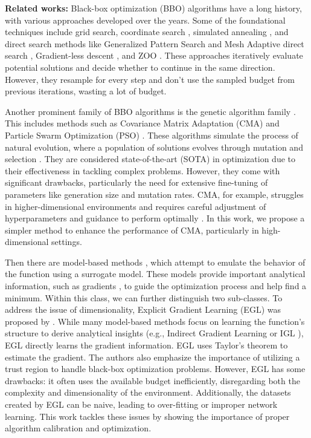 \textbf{Related works:}
Black-box optimization (BBO) algorithms have a long history, with various approaches developed over the years. Some of the foundational techniques include grid search, coordinate search \cite{audet2017searchmethods}, simulated annealing \cite{busetti2003simulated}, and direct search methods like Generalized Pattern Search and Mesh Adaptive direct search \cite{audet2017direct}, Gradient-less descent \cite{golovin2019gradientless}, and ZOO \cite{chen2017zoo}. These approaches iteratively evaluate potential solutions and decide whether to continue in the same direction. However, they resample for every step and don't use the sampled budget from previous iterations, wasting a lot of budget.

Another prominent family of BBO algorithms is the genetic algorithm family \cite{back1996evolutionary}. This includes methods such as Covariance Matrix Adaptation (CMA) \cite{hansen2016cma} and Particle Swarm Optimization (PSO) \cite{clerc2010particle}. These algorithms simulate the process of natural evolution, where a population of solutions evolves through mutation and selection \cite{audet2017genetic}. They are considered state-of-the-art (SOTA) in optimization due to their effectiveness in tackling complex problems. However, they come with significant drawbacks, particularly the need for extensive fine-tuning of parameters like generation size and mutation rates. CMA, for example, struggles in higher-dimensional environments and requires careful adjustment of hyperparameters and guidance to perform optimally \cite{loshchilov2013bi, tang2021guiding}. In this work, we propose a simpler method to enhance the performance of CMA, particularly in high-dimensional settings.

Then there are model-based methods \cite{audet2017model}, which attempt to emulate the behavior of the function using a surrogate model. These models provide important analytical information, such as gradients \cite{bertsekas2015convex}, to guide the optimization process and help find a minimum. Within this class, we can further distinguish two sub-classes.
To address the issue of dimensionality, Explicit Gradient Learning (EGL) was proposed by \cite{sarafian2020explicit}. While many model-based methods focus on learning the function’s structure to derive analytical insights (e.g., Indirect Gradient Learning or IGL \cite{lillicrap2015continuous, sarafian2020explicit}), EGL directly learns the gradient information. EGL uses Taylor's theorem to estimate the gradient. The authors also emphasize the importance of utilizing a trust region to handle black-box optimization problems. However, EGL has some drawbacks: it often uses the available budget inefficiently, disregarding both the complexity and dimensionality of the environment. Additionally, the datasets created by EGL can be naive, leading to over-fitting or improper network learning. This work tackles these issues by showing the importance of proper algorithm calibration and optimization.

